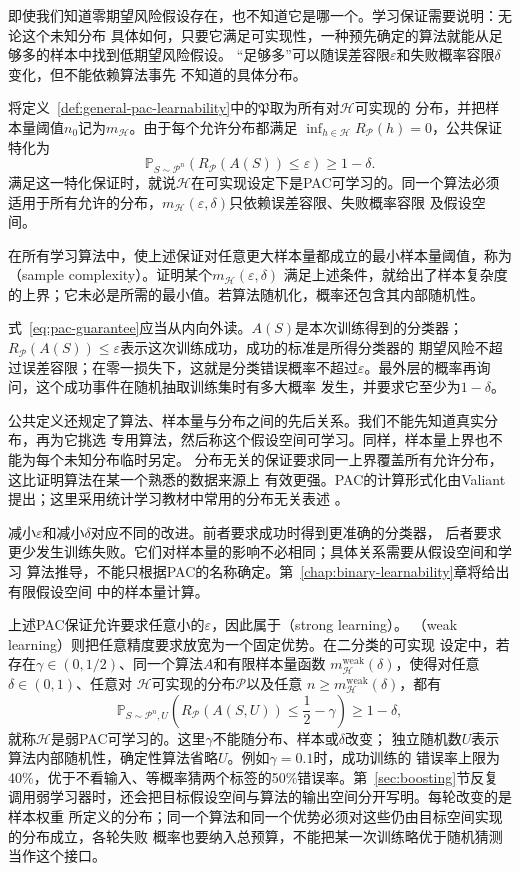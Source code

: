 即使我们知道零期望风险假设存在，也不知道它是哪一个。学习保证需要说明：无论这个未知分布
具体如何，只要它满足可实现性，一种预先确定的算法就能从足够多的样本中找到低期望风险假设。
“足够多”可以随误差容限$\varepsilon$和失败概率容限$\delta$变化，但不能依赖算法事先
不知道的具体分布。

将定义~\ref{def:general-pac-learnability}中的$\mathfrak P$取为所有对$\mathcal H$可实现的
分布，并把样本量阈值$n_0$记为$m_{\mathcal H}$。由于每个允许分布都满足
$\inf_{h\in\mathcal H}R_{\mathcal P}(h)=0$，公共保证特化为
\begin{equation}
 \mathbb P_{S\sim\mathcal P^n}
 \left(R_{\mathcal P}(A(S))\leq\varepsilon\right)\geq1-\delta.
 \label{eq:pac-guarantee}
\end{equation}
满足这一特化保证时，就说$\mathcal H$在可实现设定下是PAC可学习的。同一个算法必须
适用于所有允许的分布，$m_{\mathcal H}(\varepsilon,\delta)$只依赖误差容限、失败概率容限
及假设空间。

在所有学习算法中，使上述保证对任意更大样本量都成立的最小样本量阈值，称为
（sample complexity）。证明某个$m_{\mathcal H}(\varepsilon,\delta)$
满足上述条件，就给出了样本复杂度的上界；它未必是所需的最小值。若算法随机化，概率还包含其内部随机性。

式~\eqref{eq:pac-guarantee}应当从内向外读。$A(S)$是本次训练得到的分类器；
$R_{\mathcal P}(A(S))\leq\varepsilon$表示这次训练成功，成功的标准是所得分类器的
期望风险不超过误差容限；在零一损失下，这就是分类错误概率不超过$\varepsilon$。最外层的概率再询问，这个成功事件在随机抽取训练集时有多大概率
发生，并要求它至少为$1-\delta$。

公共定义还规定了算法、样本量与分布之间的先后关系。我们不能先知道真实分布，再为它挑选
专用算法，然后称这个假设空间可学习。同样，样本量上界也不能为每个未知分布临时另定。
分布无关的保证要求同一上界覆盖所有允许分布，这比证明算法在某一个熟悉的数据来源上
有效更强。PAC的计算形式化由Valiant提出；这里采用统计学习教材中常用的分布无关表述
。

减小$\varepsilon$和减小$\delta$对应不同的改进。前者要求成功时得到更准确的分类器，
后者要求更少发生训练失败。它们对样本量的影响不必相同；具体关系需要从假设空间和学习
算法推导，不能只根据PAC的名称确定。第~\ref{chap:binary-learnability}章将给出有限假设空间
中的样本量计算。

上述PAC保证允许要求任意小的$\varepsilon$，因此属于（strong learning）。
（weak learning）则把任意精度要求放宽为一个固定优势。在二分类的可实现
设定中，若存在$\gamma\in(0,1/2)$、同一个算法$A$和有限样本量函数
$m_{\mathcal H}^{\mathrm{weak}}(\delta)$，使得对任意$\delta\in(0,1)$、任意对
$\mathcal H$可实现的分布$\mathcal P$以及任意
$n\geq m_{\mathcal H}^{\mathrm{weak}}(\delta)$，都有
\[
 \mathbb P_{S\sim\mathcal P^n,U}\!\left(
 R_{\mathcal P}(A(S,U))\leq\frac12-\gamma
 \right)\geq1-\delta,
\]
就称$\mathcal H$是弱PAC可学习的。这里$\gamma$不能随分布、样本或$\delta$改变；
独立随机数$U$表示算法内部随机性，确定性算法省略$U$。例如$\gamma=0.1$时，成功训练的
错误率上限为40\%，优于不看输入、等概率猜两个标签的50\%错误率。第~\ref{sec:boosting}节反复
调用弱学习器时，还会把目标假设空间与算法的输出空间分开写明。每轮改变的是样本权重
所定义的分布；同一个算法和同一个优势必须对这些仍由目标空间实现的分布成立，各轮失败
概率也要纳入总预算，不能把某一次训练略优于随机猜测当作这个接口。

